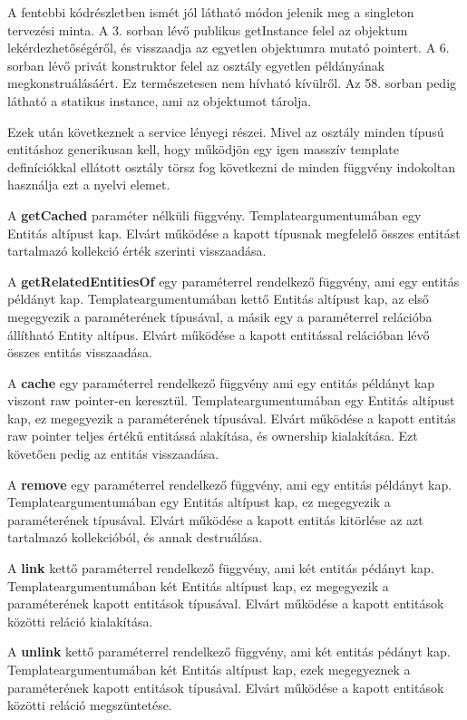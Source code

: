 A fentebbi kódrészletben ismét jól látható módon jelenik meg a singleton tervezési minta. A 3. sorban lévő publikus getInstance felel az objektum lekérdezhetőségéről, és visszaadja az egyetlen objektumra mutató pointert. A 6. sorban lévő privát konstruktor felel az osztály egyetlen példányának megkonstruálásáért. Ez természetesen nem hívható kívülről. Az 58. sorban pedig látható a statikus instance, ami az objektumot tárolja.

Ezek után következnek a service lényegi részei. Mivel az osztály minden típusú entitáshoz generikusan kell, hogy működjön egy igen masszív template definíciókkal ellátott osztály törsz fog következni de minden függvény indokoltan használja ezt a nyelvi elemet.

A \textbf{getCached} paraméter nélküli függvény. Templateargumentumában egy Entitás altípust kap. Elvárt működése a kapott típusnak megfelelő összes entitást tartalmazó kollekció érték szerinti visszaadása.

A \textbf{getRelatedEntitiesOf} egy paraméterrel rendelkező függvény, ami egy entitás példányt kap. Templateargumentumában kettő Entitás altípust kap, az első megegyezik a paraméterének típusával, a másik egy a paraméterrel relációba állítható Entity altípus. Elvárt működése a kapott entitással relációban lévő összes entitás visszaadása.

A \textbf{cache} egy paraméterrel rendelkező függvény ami egy entitás példányt kap viszont raw pointer-en keresztül. Templateargumentumában egy Entitás altípust kap, ez megegyezik a paraméterének típusával. Elvárt működése a kapott entitás raw pointer teljes értékű entitássá alakítása, és ownership kialakítása. Ezt követően pedig az entitás visszaadása.

A \textbf{remove} egy paraméterrel rendelkező függvény, ami egy entitás példányt kap. Templateargumentumában egy Entitás altípust kap, ez megegyezik a paraméterének típusával. Elvárt működése a kapott entitás kitörlése az azt tartalmazó kollekcióból, és annak destruálása.

A \textbf{link} kettő paraméterrel rendelkező függvény, ami két entitás pédányt kap. Templateargumentumában két Entitás altípust kap, ez megegyezik a paraméterének kapott entitások típusával. Elvárt működése a kapott entitások közötti reláció kialakítása.

A \textbf{unlink} kettő paraméterrel rendelkező függvény, ami két entitás pédányt kap. Templateargumentumában két Entitás altípust kap, ezek megegyeznek a paraméterének kapott entitások típusával. Elvárt működése a kapott entitások közötti reláció megszüntetése.

